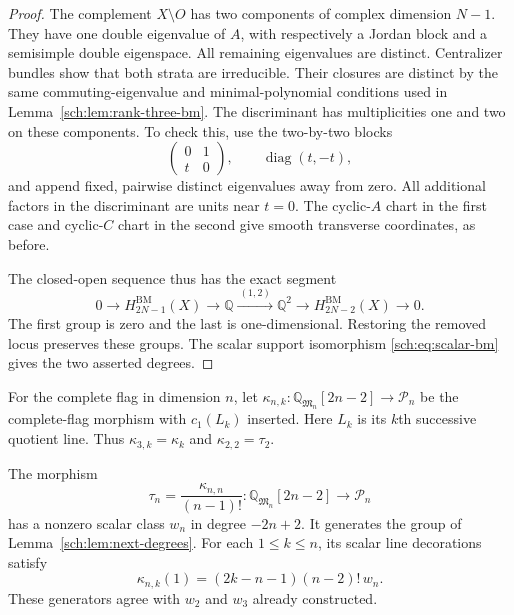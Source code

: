 \begin{proof}
The complement $X\setminus O$ has two components of complex
dimension $N-1$. They have one double eigenvalue of $A$, with
respectively a Jordan block and a semisimple double eigenspace.
All remaining eigenvalues are distinct. Centralizer bundles show
that both strata are irreducible. Their closures are distinct by
the same commuting-eigenvalue and minimal-polynomial conditions used
in Lemma~\ref{sch:lem:rank-three-bm}.
The discriminant has multiplicities one and two on these components.
To check this, use the two-by-two blocks
\[
 \begin{pmatrix}0&1\\t&0\end{pmatrix},\qquad
 \operatorname{diag}(t,-t),
\]
and append fixed, pairwise distinct eigenvalues away from zero.
All additional factors in the discriminant are units near $t=0$.
The cyclic-$A$ chart in the first case and cyclic-$C$ chart in the
second give smooth transverse coordinates, as before.

The closed-open sequence thus has the exact segment
\[
 0\longrightarrow H^{\mathrm{BM}}_{2N-1}(X)
 \longrightarrow\mathbb Q\xrightarrow{\ (1,2)\ }\mathbb Q^2
 \longrightarrow H^{\mathrm{BM}}_{2N-2}(X)\longrightarrow0.
\]
The first group is zero and the last is one-dimensional.
Restoring the removed locus preserves these groups.
The scalar support isomorphism \eqref{sch:eq:scalar-bm} gives the
two asserted degrees.
\end{proof}

For the complete flag in dimension $n$, let
$\kappa_{n,k}:\mathbb Q_{\mathfrak M_n}[2n-2]\to\mathcal P_n$
be the complete-flag morphism with $c_1(L_k)$ inserted.
Here $L_k$ is its $k$th successive quotient line.
Thus $\kappa_{3,k}=\kappa_k$ and
$\kappa_{2,2}=\tau_2$.

\begin{proposition}
\label{sch:prop:higher-generators}
The morphism
\[
 \tau_n=\frac{\kappa_{n,n}}{(n-1)!}
       :\mathbb Q_{\mathfrak M_n}[2n-2]\longrightarrow\mathcal P_n
\]
has a nonzero scalar class $w_n$ in degree $-2n+2$.
It generates the group of Lemma~\ref{sch:lem:next-degrees}.
For each $1\leq k\leq n$, its scalar line decorations satisfy
\[
 \kappa_{n,k}(1)=(2k-n-1)(n-2)!\,w_n.
\]
These generators agree with $w_2$ and $w_3$ already constructed.
\end{proposition}

